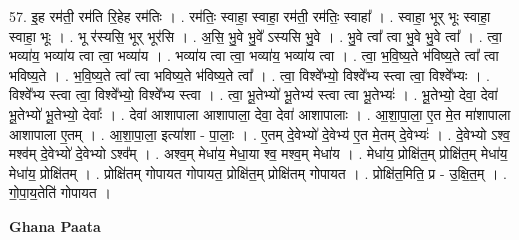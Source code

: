 \documentclass[17pt]{extarticle}
\begin{document}
57. इ॒ह रम॑ती॒ रम॑ति रि॒हेह रम॑तिः । . रम॑तिः॒ स्वाहा॒ स्वाहा॒ रम॑ती॒ रम॑तिः॒ स्वाहा᳚ । . स्वाहा॒ भूर् भूः स्वाहा॒ स्वाहा॒ भूः । . भू र॑स्यसि॒ भूर् भूर॑सि । . अ॒सि॒ भु॒वे भु॒वे᳚ ऽस्यसि भु॒वे । . भु॒वे त्वा᳚ त्वा भु॒वे भु॒वे त्वा᳚ । . त्वा॒ भव्या॑य॒ भव्या॑य त्वा त्वा॒ भव्या॑य । . भव्या॑य त्वा त्वा॒ भव्या॑य॒ भव्या॑य त्वा । . त्वा॒ भ॒वि॒ष्य॒ते भ॑विष्य॒ते त्वा᳚ त्वा भविष्य॒ते । . भ॒वि॒ष्य॒ते त्वा᳚ त्वा भविष्य॒ते भ॑विष्य॒ते त्वा᳚ । . त्वा॒ विश्वे᳚भ्यो॒ विश्वे᳚भ्य स्त्वा त्वा॒ विश्वे᳚भ्यः । . विश्वे᳚भ्य स्त्वा त्वा॒ विश्वे᳚भ्यो॒ विश्वे᳚भ्य स्त्वा । . त्वा॒ भू॒तेभ्यो॑ भू॒तेभ्य॑ स्त्वा त्वा भू॒तेभ्यः॑ । . भू॒तेभ्यो॒ देवा॒ देवा॑ भू॒तेभ्यो॑ भू॒तेभ्यो॒ देवाः᳚ । . देवा॑ आशापाला आशापाला॒ देवा॒ देवा॑ आशापालाः । . आ॒शा॒पा॒ला॒ ए॒त मे॒त मा॑शापाला आशापाला ए॒तम् । . आ॒शा॒पा॒ला॒ इत्या॑शा - पा॒लाः॒ । . ए॒तम् दे॒वेभ्यो॑ दे॒वेभ्य॑ ए॒त मे॒तम् दे॒वेभ्यः॑ । . दे॒वेभ्यो ऽश्व॒ मश्व॑म् दे॒वेभ्यो॑ दे॒वेभ्यो ऽश्व᳚म् । . अश्व॒म् मेधा॑य॒ मेधा॒या श्व॒ मश्व॒म् मेधा॑य । . मेधा॑य॒ प्रोक्षि॑त॒म् प्रोक्षि॑त॒म् मेधा॑य॒ मेधा॑य॒ प्रोक्षि॑तम् । . प्रोक्षि॑तम् गोपायत गोपायत॒ प्रोक्षि॑त॒म् प्रोक्षि॑तम् गोपायत । . प्रोक्षि॑त॒मिति॒ प्र - उ॒क्षि॒त॒म् । . गो॒पा॒य॒तेति॑ गोपायत । \newline

\textbf{Ghana Paata } \newline
\end{document}
